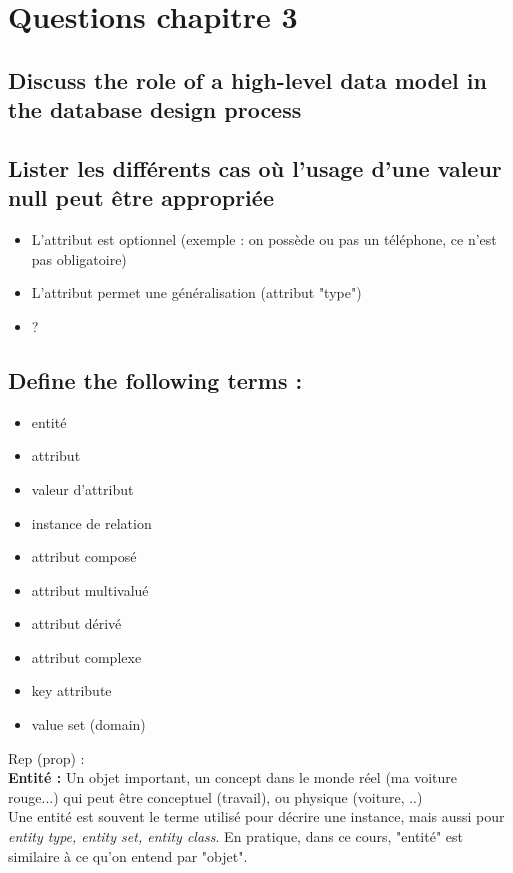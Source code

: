 \section{Questions chapitre 3}

\subsection{Discuss the role of a high-level data model in the database design process}

\subsection{Lister les différents cas où l'usage d'une valeur null peut être appropriée}
\begin{itemize}
\item L'attribut est optionnel (exemple : on possède ou pas un téléphone, ce n'est pas obligatoire)
\item L'attribut permet une généralisation (attribut "type")
\item ? 
\end{itemize}

\subsection{Define the following terms :}

\begin{itemize}
	\item entité
	\item attribut
	\item valeur d'attribut
	\item instance de relation
	\item attribut composé 
	\item attribut multivalué
	\item attribut dérivé
	\item attribut complexe
	\item key attribute
	\item value set (domain)
\end{itemize}

\noindent
Rep (prop) :\\ 

\textbf{Entité :} 
Un objet important, un concept dans le monde réel (ma voiture rouge...) qui peut être conceptuel (travail), ou physique (voiture, ..) \\
Une entité est souvent le terme utilisé pour décrire une instance, mais aussi pour \textit{entity type, entity set, entity class}.
En pratique, dans ce cours, "entité" est similaire à ce qu'on entend par "objet".

